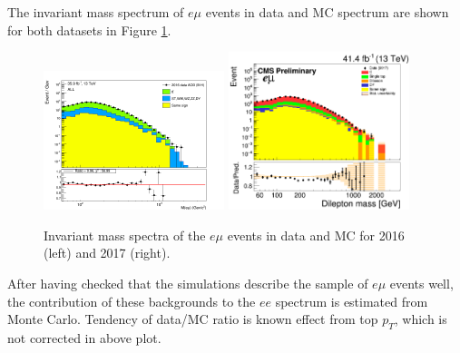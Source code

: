 The invariant mass spectrum of $e\mu$ events in data and MC spectrum are shown for both datasets in Figure \ref{fig:ttbaremu}.

\begin{figure}[!htb]
\begin{center}
\includegraphics[angle=0,width=0.47\textwidth]{figures/Zprime/2016/bkg_ttbar/SS/hratio_M_emu1__ALL.png}
\includegraphics[angle=0,width=0.47\textwidth]{figures/Zprime/2017/bkg_ttbar/SS/ALL_hratio_M_emu_massDep.png}
\caption{Invariant mass spectra of the $e\mu$ events in data and MC for 2016 (left) and 2017 (right).}
\label{fig:ttbaremu}
\end{center}
\end{figure}

After having checked that the simulations describe the sample of $e\mu$ events well, the
contribution of these backgrounds to the $ee$ spectrum is estimated from Monte Carlo.
Tendency of data/MC ratio is known effect from top $p_{T}$, which is not corrected in above plot.



